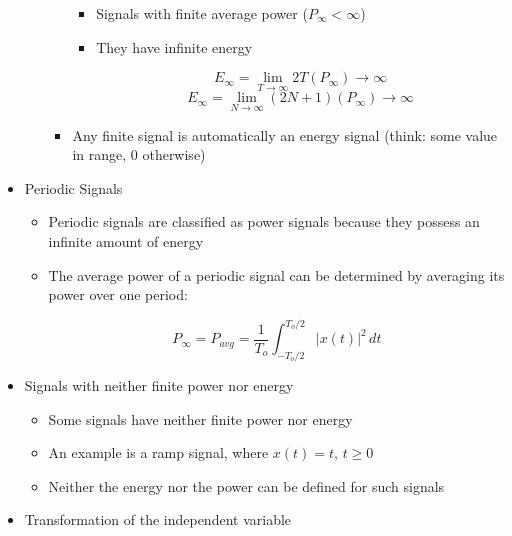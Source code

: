 \begin{itemize}
\begin{itemize}
\begin{itemize}
\begin{itemize}
              \item Signals with finite average power ($P_{\infty} < \infty$)

              \item They have infinite energy

                $$E_{\infty}=\lim_{T\to\infty}2T(P_{\infty})\to\infty$$
                $$E_{\infty}=\lim_{N\to\infty}(2N+1)(P_{\infty})\to\infty$$

            \end{itemize}

          \item Any finite signal is automatically an energy signal (think: some value in range, 0 otherwise)

        \end{itemize}

    \end{itemize}

  \item Periodic Signals

    \begin{itemize}

      \item Periodic signals are classified as power signals because they possess an infinite amount of energy

      \item The average power of a periodic signal can be determined by averaging its power over one period:

        $$P_{\infty}=P_{avg}=\frac{1}{T_o}\int_{-T_o/2}^{T_o/2}|x(t)|^2\,dt$$

    \end{itemize}

  \item Signals with neither finite power nor energy

    \begin{itemize}

      \item Some signals have neither finite power nor energy

      \item An example is a ramp signal, where $x(t)=t,\,t\geq 0$

      \item Neither the energy nor the power can be defined for such signals

    \end{itemize}

  \item Transformation of the independent variable


\end{itemize}
